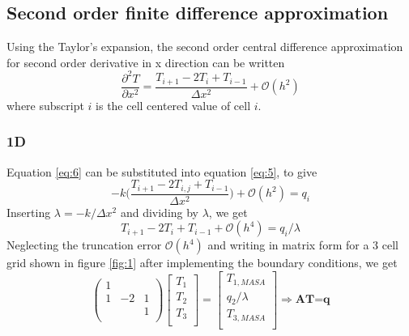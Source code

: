 \documentclass[12pt]{amsart}   %
\begin{document}
\subsection{Second order finite difference approximation}
Using the Taylor's expansion, the second order central difference approximation for second order derivative in x direction can be written
\begin{equation}\label{eq:6}
 \frac{ \partial^2 T}{\partial x^2}=\frac{T_{i+1} -2T_{i} + T_{i-1}}{\Delta x^2}+\mathcal{O}(h^2)  
\end{equation}
where subscript $i$ is the cell centered value of cell $i$.
\subsubsection{1D} Equation \ref{eq:6} can be substituted into equation \ref{eq:5}, to give
\begin{equation}
-k \Bigg(\frac{T_{i+1} -2T_{i,j} + T_{i-1}}{\Delta x^2} \Bigg)+\mathcal{O}(h^2) = q_i
\end{equation}
Inserting $\lambda = -k/\Delta x^2$ and dividing by $\lambda$, we get
\begin{equation}
{T_{i+1} -2T_{i} + T_{i-1}} +\mathcal{O}(h^4) = q_i/\lambda
\end{equation}
Neglecting the truncation error $\mathcal{O}(h^4)$ and writing in matrix form for a 3 cell grid shown in figure \ref{fig:1} after implementing the boundary conditions, we get
\begin{equation}
 \begin{pmatrix}
1 &  &  \\
1 & -2 & 1 \\
 &  & 1 \\
\end{pmatrix} \begin{bmatrix}
T_{1}\\
T_{2}\\
T_{3}\\
\end{bmatrix} =
\begin{bmatrix}
T_{1,MASA}\\
{q_{2}}/\lambda\\
{T_{3,MASA}}\\
\end{bmatrix} \Rightarrow \textbf{AT=q}
\end{equation}
\end{document}
